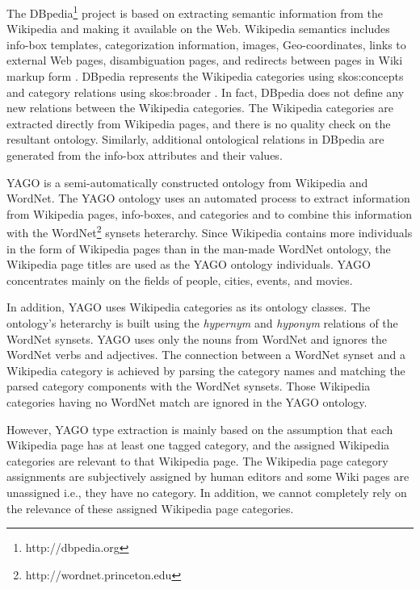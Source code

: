 The DBpedia\footnote{http://dbpedia.org} project is based on extracting 
semantic information from the Wikipedia and making it available on the Web. 
Wikipedia semantics includes info-box templates, categorization information, 
images, Geo-coordinates, links to external Web pages, disambiguation pages, 
and redirects between pages in Wiki markup form \cite{Auer07dbpedia:a, Bizer2009}. 
DBpedia represents the Wikipedia categories using skos:concepts and category 
relations using skos:broader \cite{Auer07dbpedia:a, Bizer2009}. In fact, 
DBpedia does not define any new relations between the Wikipedia categories. 
The Wikipedia categories are extracted directly from Wikipedia pages, and there 
is no quality check on the resultant ontology. Similarly, additional ontological 
relations in DBpedia are generated from the info-box attributes and their values.

YAGO is a semi-automatically constructed ontology from Wikipedia and
WordNet\cite{Suchanek2009phd}. The YAGO ontology uses an automated process to
extract information from Wikipedia pages, info-boxes, and categories and to
combine this information with the WordNet\footnote{http://wordnet.princeton.edu}
synsets heterarchy. Since Wikipedia contains more individuals in the form of
Wikipedia pages than in the man-made WordNet ontology, the Wikipedia page titles
are used as the YAGO ontology individuals. YAGO concentrates mainly on the
fields of people, cities, events, and movies\cite{Suchanek2009phd}. 

In addition, YAGO uses Wikipedia categories as its ontology classes. The
ontology's heterarchy is built using the \textit{hypernym} and \textit{hyponym}
relations of the WordNet synsets. YAGO uses only the nouns from WordNet and
ignores the WordNet verbs and adjectives. The connection between a WordNet
synset and a Wikipedia category is achieved by parsing the category names and
matching the parsed category components with the WordNet
synsets\cite{Suchanek2009phd}. Those Wikipedia categories having no WordNet
match are ignored in the YAGO ontology.  
  
However, YAGO type extraction is mainly based on the assumption that
each Wikipedia page has at least one tagged category, and the assigned Wikipedia
categories are relevant to that Wikipedia page. The Wikipedia page category
assignments are subjectively assigned by human editors and some Wiki pages are
unassigned i.e., they have no category. In addition, we cannot completely rely
on the relevance of these assigned Wikipedia page categories. 


